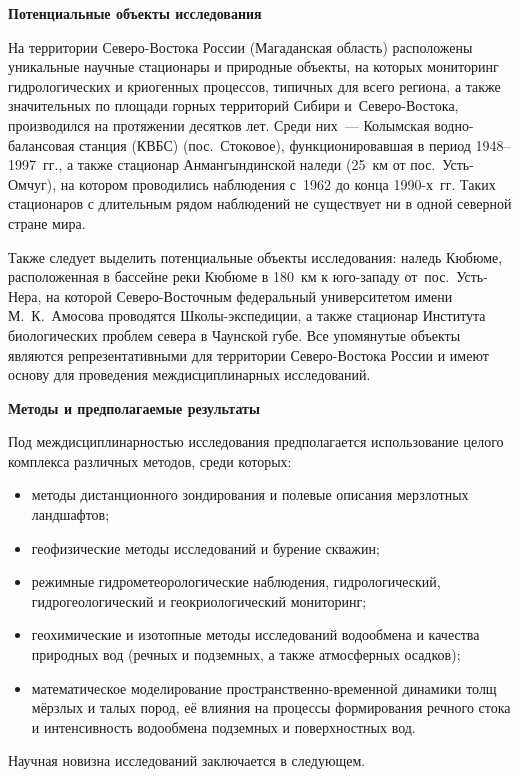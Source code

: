 \textbf{Потенциальные объекты исследования}

На территории Северо-Востока России (Магаданская область) расположены уникальные научные стационары и природные объекты, на которых мониторинг гидрологических и криогенных процессов, типичных для всего региона, а также значительных по площади горных территорий Сибири и~Северо-Востока, производился на протяжении десятков лет. Среди них~--- Колымская водно-балансовая станция (КВБС) (пос.~Стоковое), функционировавшая в период 1948--1997~гг., а также стационар Анмангындинской наледи (25~км от пос.~Усть-Омчуг), на котором проводились наблюдения с~1962 до конца 1990-х~гг. Таких стационаров с длительным рядом наблюдений не существует ни в одной северной стране мира.

Также следует выделить потенциальные объекты исследования: наледь Кюбюме, расположенная в бассейне реки Кюбюме в 180~км к юго-западу от~пос.~Усть-Нера, на которой Северо-Восточным федеральный университетом имени М.~К.~Амосова проводятся Школы-экспедиции, а также стационар Института биологических проблем севера в Чаунской губе. Все упомянутые объекты являются репрезентативными для территории Северо-Востока России и имеют основу для проведения междисциплинарных исследований.

\textbf{Методы и предполагаемые результаты}

Под междисциплинарностью исследования предполагается использование целого комплекса различных методов, среди которых:
\begin{itemize}[noitemsep]\vspace{-8pt}
  \item методы дистанционного зондирования и полевые описания мерзлотных ландшафтов;
  \item геофизические методы исследований и бурение скважин;
  \item режимные гидрометеорологические наблюдения, гидрологический, гидрогеологический и геокриологический мониторинг;
  \item геохимические и изотопные методы исследований водообмена и качества природных вод (речных и подземных, а также атмосферных осадков);
  \item математическое моделирование пространственно-временной динамики толщ мёрзлых и талых пород, её влияния на процессы формирования речного стока и интенсивность водообмена подземных и поверхностных вод.
\end{itemize}
 \vspace{-8pt}
Научная новизна исследований заключается в следующем.

